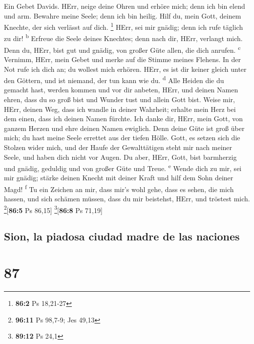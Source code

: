  Ein Gebet Davids. HErr, neige deine Ohren und erhöre
mich; denn ich bin elend und arm.  Bewahre meine Seele;
denn ich bin heilig. Hilf du, mein Gott, deinem Knechte, der sich
verlässt auf dich. \footnote{\textbf{86:2} Ps 18,21-27} 
HErr, sei mir gnädig; denn ich rufe täglich zu dir! \textsuperscript{b}
 Erfreue die Seele deines Knechtes; denn nach dir, HErr,
verlangt mich.  Denn du, HErr, bist gut und gnädig, von
großer Güte allen, die dich anrufen. \textsuperscript{c} 
Vernimm, HErr, mein Gebet und merke auf die Stimme meines Flehens.
 In der Not rufe ich dich an; du wollest mich erhören.
 HErr, es ist dir keiner gleich unter den Göttern, und ist
niemand, der tun kann wie du. \textsuperscript{d}  Alle
Heiden die du gemacht hast, werden kommen und vor dir anbeten, HErr, und
deinen Namen ehren,  dass du so groß bist und Wunder tust
und allein Gott bist.  Weise mir, HErr, deinen Weg, dass
ich wandle in deiner Wahrheit; erhalte mein Herz bei dem einen, dass ich
deinen Namen fürchte.  Ich danke dir, HErr, mein Gott,
von ganzem Herzen und ehre deinen Namen ewiglich.  Denn
deine Güte ist groß über mich; du hast meine Seele errettet aus der
tiefen Hölle.  Gott, es setzen sich die Stolzen wider
mich, und der Haufe der Gewalttätigen steht mir nach meiner Seele, und
haben dich nicht vor Augen.  Du aber, HErr, Gott, bist
barmherzig und gnädig, geduldig und von großer Güte und Treue.
\textsuperscript{e}  Wende dich zu mir, sei mir gnädig;
stärke deinen Knecht mit deiner Kraft und hilf dem Sohn deiner Magd!
\textsuperscript{f}  Tu ein Zeichen an mir, dass mir's
wohl gehe, dass es sehen, die mich hassen, und sich schämen müssen, dass
du mir beistehst, HErr, und tröstest mich. \footnote{\textbf{96:11} Ps
  98,7-9; Jes 49,13}{[}\textbf{86:5} Ps 86,15{]}
\footnote{\textbf{89:12} Ps 24,1}{[}\textbf{86:8} Ps 71,19{]}

\hypertarget{sion-la-piadosa-ciudad-madre-de-las-naciones}{%
\subsection{Sion, la piadosa ciudad madre de las
naciones}\label{sion-la-piadosa-ciudad-madre-de-las-naciones}}

\hypertarget{section-86}{%
\section{87}\label{section-86}}

